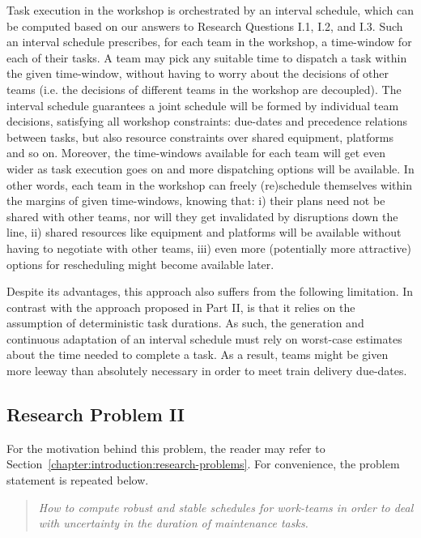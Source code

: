  	Task execution in the workshop is orchestrated by an interval schedule,
	which can be computed based on our answers to Research Questions I.1, I.2, and I.3.
	Such an interval schedule prescribes, 
	for each team in the workshop, a time-window for each of their tasks.
	A team may pick any suitable time to dispatch a task within the given time-window,
	without having to worry about the decisions of other teams
	(i.e. the decisions of different teams in the workshop are decoupled).
	The interval schedule guarantees a joint schedule will be formed by individual team decisions,
	satisfying all workshop constraints: due-dates and precedence relations between tasks, 
	but also resource constraints over shared equipment, platforms and so on.
	Moreover, the time-windows available for each team will get even wider as task execution goes on and more dispatching options will be available.
	In other words, each team in the workshop can freely (re)schedule themselves within the margins of given time-windows, knowing that:
	i) their plans need not be shared with other teams, nor will they get invalidated by disruptions down the line,
	ii) shared resources like equipment and platforms will be available without having to negotiate with other teams,
	iii) even more (potentially more attractive) options for rescheduling might become available later.
	
	Despite its advantages, this approach also suffers from the following limitation.
	In contrast with the approach proposed in Part II,
	is that it relies on the assumption of deterministic task durations.
	As such, the generation and continuous adaptation of an interval schedule must rely on worst-case estimates about the time needed to complete a task.
	As a result, teams might be given more leeway than absolutely necessary in order to meet train delivery due-dates.

 
\subsection{Research Problem II}

	For the motivation behind this problem, the reader may refer to Section~\ref{chapter:introduction:research-problems}.
 	For convenience, the problem statement is repeated below.
 	
	\begin{quote}
		\emph{How to compute robust and stable schedules for work-teams in order to deal with uncertainty in the duration of maintenance tasks.}
	\end{quote}

